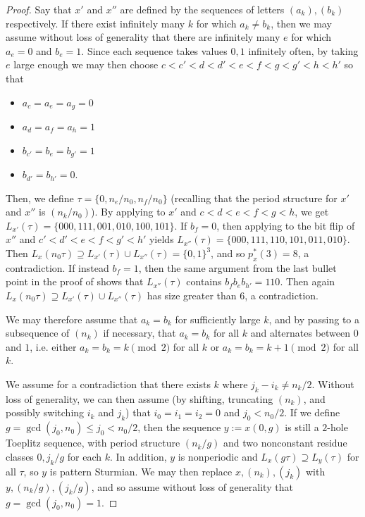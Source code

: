 \documentclass[11pt,reqno]{amsart}
\theoremstyle{definition}
\theoremstyle{plain}
\newcommand{\AuthornoteA}[2]{{\sf\small\color{magenta}{[#1: #2]}}}
\newcommand{\Anote}{\AuthornoteA{A}}
\begin{document}
\begin{proof}
Say that $x'$ and $x''$ are defined by the sequences of letters $(a_k), (b_k)$ respectively. If there exist infinitely many $k$ for which $a_k \neq b_k$, then we may assume without loss of generality that there are infinitely many $e$ for which $a_e = 0$ and $b_e = 1$. Since each sequence takes values $0,1$ infinitely often, by taking $e$ large enough we may then choose 
$c < c' < d < d' < e < f < g < g' < h < h'$ so that
\begin{itemize}
\item $a_c = a_e = a_g = 0$ 
\item $a_d = a_f = a_h = 1$
\item $b_{c'} = b_e = b_{g'} = 1$
\item $b_{d'} = b_{h'} = 0$.
\end{itemize}
Then, we define $\tau = \{0, n_e/n_0, n_f/n_0\}$ (recalling that the period structure for $x'$ and $x''$ is $(n_k/n_0)$). By applying  to $x'$ and $c < d < e < f < g < h$, we get 
$L_{x'}(\tau) = \{000, 111, 001, 010, 100, 101\}$. If $b_f = 0$, then applying  to the bit flip of $x''$
and $c' < d' < e < f < g' < h'$ yields $L_{x''}(\tau) = \{000, 111, 110, 101, 011, 010\}$. %
Then $L_x(n_0 \tau) \supseteq L_{x'}(\tau) \cup L_{x''}(\tau) = \{0,1\}^3$, and so $p^*_x(3) = 8$, a contradiction.
If instead $b_f = 1$, then the same argument from the last bullet point in the proof of  shows that
$L_{x''}(\tau)$ contains $b_f b_e b_{h'} = 110$. Then again $L_x(n_0 \tau) \supseteq L_{x'}(\tau) \cup L_{x''}(\tau)$ has size greater than $6$, a contradiction.

We may therefore assume that $a_k = b_k$ for sufficiently large $k$, and by passing to a subsequence of $(n_k)$ if necessary, that $a_k = b_k$ for all $k$ and alternates between $0$ and $1$, i.e. either $a_k = b_k = k \pmod 2$ for all $k$ or $a_k = b_k = k + 1\pmod 2$ for all $k$.


We assume for a contradiction that there exists $k$ where $j_k - i_k \neq n_k/2$. Without loss of generality, we can then assume (by shifting, truncating $(n_k)$, and possibly switching $i_k$ and $j_k$) that $i_0 = i_1 = i_2 = 0$ and $j_0 < n_0/2$.
If we define $g = \gcd(j_0, n_0) \leq j_0 < n_0/2$, then the sequence $y := x(0, g)$ is still a $2$-hole Toeplitz sequence, with period structure $(n_k/g)$ and two nonconstant residue classes $0, j_k/g$ for each $k$. 
In addition, $y$ is nonperiodic and $L_x(g\tau) \supseteq L_y(\tau)$ for all $\tau$, so $y$ is pattern Sturmian. We may then replace 
$x, (n_k), (j_k)$ with $y, (n_k/g), (j_k/g)$, and so assume without loss of generality that $g = \gcd(j_0, n_0) = 1$.


\end{proof}
\end{document}
